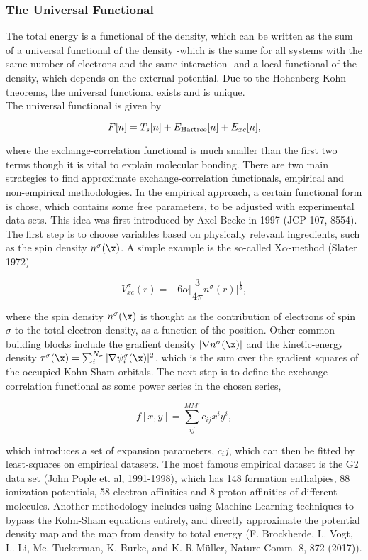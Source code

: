 \documentclass{homework}
\begin{document}
\subsubsection{The Universal Functional}

The total energy is a functional of the density, which can be written as the sum of a universal functional of the density -which is the same for all systems with the same number of electrons and the same interaction- and a local functional of the density, which depends on the external potential. Due to the Hohenberg-Kohn theorems, the universal functional exists and is unique. \\

The universal functional is given by 

\begin{equation}
    F[n] = T_s[n] + E_{\textnormal{Hartree}}[n] + E_{xc}[n], 
\end{equation}

where the exchange-correlation functional is much smaller than the first two terms though it is vital to explain molecular bonding. There are two main strategies to find approximate exchange-correlation functionals, empirical and non-empirical methodologies. In the empirical approach, a certain functional form is chose, which contains some free parameters, to be adjusted with experimental data-sets. This idea was first introduced by Axel Becke in 1997 (JCP 107, 8554). The first step is to choose variables based on physically relevant ingredients, such as the spin density $n^{\sigma}(\x)$. A simple example is the so-called X$\alpha$-method (Slater 1972) 

$$
V_{xc}^{\sigma}(r) = -6\alpha \bigg[\frac{3}{4\pi} n^{\sigma}(r)\bigg]^{\frac{1}{3}},
$$

where the spin density $n^{\sigma}(\x)$ is thought as the contribution of electrons of spin $\sigma$ to the total electron density, as a function of the position. Other common building blocks include the gradient density $|\nabla n^{\sigma}(\x)|$ and the kinetic-energy density $\tau^{\sigma}(\x) = \sum_{i}^{N_\sigma} |\nabla \psi_i^\sigma(\x)|^2$, which is the sum over the gradient squares of the occupied Kohn-Sham orbitals. The next step is to define the exchange-correlation functional as some power series in the chosen series, 

$$
f[x,y] = \sum_{ij}^{MM'} c_{ij} x^i y^i,
$$

which introduces a set of expansion parameters, $c_ij$, which can then be fitted by least-squares on empirical datasets. The most famous empirical dataset is the G2 data set (John Pople et. al, 1991-1998), which has 148 formation enthalpies, 88 ionization potentials, 58 electron affinities and 8 proton affinities of different molecules. Another methodology includes using Machine Learning techniques to bypass the Kohn-Sham equations entirely, and directly approximate the potential density map and the map from density to total energy (F. Brockherde, L. Vogt, L. Li, Me. Tuckerman, K. Burke, and K.-R M\"uller, Nature Comm. 8, 872 (2017)). \\
\end{document}
